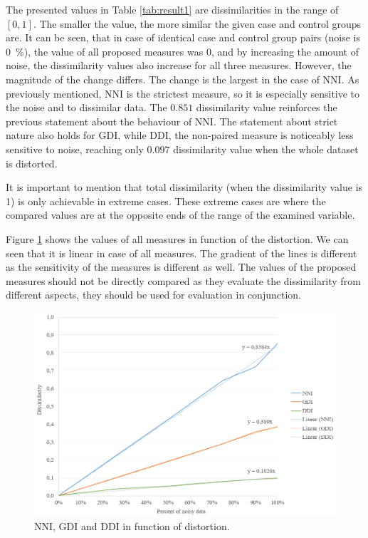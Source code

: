 	The presented values in Table \ref{tab:result1} are dissimilarities in the range of $[0,1]$. The smaller the value, the more similar the given case and control groups are. It can be seen, that in case of identical case and control group pairs (noise is \SI{0}{\percent}), the value of all proposed measures was 0, and by increasing the amount of noise, the dissimilarity values also increase for all three measures. However, the magnitude of the change differs. The change is the largest in the case of NNI. As previously mentioned, NNI is the strictest measure, so it is especially sensitive to the noise and to dissimilar data. The $0.851$ dissimilarity value reinforces the previous statement about the behaviour of NNI. The statement about strict nature also holds for GDI, while DDI, the non-paired measure is noticeably less sensitive to noise, reaching only $0.097$ dissimilarity value when the whole dataset is distorted.

     It is important to mention that total dissimilarity (when the dissimilarity value is 1) is only achievable in extreme cases. These extreme cases are where the compared values are at the opposite ends of the range of the examined variable.

     Figure \ref{fig:linear} shows the values of all measures in function of the distortion. We can seen that it is linear in case of all measures. The gradient of the lines is different as the sensitivity of the measures is different as well. The values of the proposed measures should not be directly compared as they evaluate the dissimilarity from different aspects, they should be used for evaluation in conjunction.
     
 				
        \begin{figure}[h]
			\centering
                \captionsetup{justification=centering}
			\includegraphics[width=0.75\linewidth]{assets/figures/control_group_selection/measures/linear.png}
                \caption{NNI, GDI and DDI in function of distortion.}
			\label{fig:linear}
		\end{figure} 

